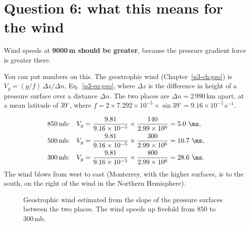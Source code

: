 \section{Question 6: what this means for the wind}

\begin{answerbox}
Wind speeds at \textbf{9000\,m should be greater}, because the pressure gradient force is greater there.
\end{answerbox}

You can put numbers on this. The geostrophic wind (Chapter~\ref{p3-ch:geo}) is
$V_g=(g/f)\,\Delta z/\Delta n$, Eq.~\eqref{p3-eq:geo}, where $\Delta z$ is the difference in height of a pressure surface over a distance $\Delta n$. The two places are $\Delta n=2\,990$\,km apart, at a mean latitude of $39^\circ$, where $f=2\times7.292\times10^{-5}\times\sin39^\circ=9.16\times10^{-5}$\,s$^{-1}$.

\begin{workedbox}
\begin{align*}
\text{850\,mb:}\quad V_g&=\frac{9.81}{9.16\times10^{-5}}\times\frac{140}{2.99\times10^{6}}=5.0\ \ms,\\
\text{500\,mb:}\quad V_g&=\frac{9.81}{9.16\times10^{-5}}\times\frac{300}{2.99\times10^{6}}=10.7\ \ms,\\
\text{300\,mb:}\quad V_g&=\frac{9.81}{9.16\times10^{-5}}\times\frac{800}{2.99\times10^{6}}=28.6\ \ms.
\end{align*}
The wind blows from west to east (Monterrey, with the higher surfaces, is to the south, on the right of the wind in the Northern Hemisphere).
\end{workedbox}

\begin{figure}[ht]
\centering
{}
\caption{Geostrophic wind estimated from the slope of the pressure surfaces between the two places. The wind speeds up fivefold from 850 to 300\,mb.}
\end{figure}

